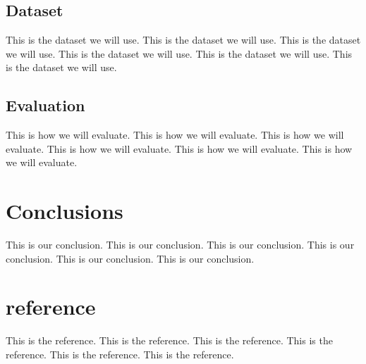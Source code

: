 \documentclass[sigconf]{acmart}
\begin{document}
\subsection{Dataset}
This is the dataset we will use.
This is the dataset we will use.
This is the dataset we will use.
This is the dataset we will use.
This is the dataset we will use.
This is the dataset we will use.

\subsection{Evaluation}
This is how we will evaluate.
This is how we will evaluate.
This is how we will evaluate.
This is how we will evaluate.
This is how we will evaluate.
This is how we will evaluate.


\section{Conclusions}
This is our conclusion.
This is our conclusion.
This is our conclusion.
This is our conclusion.
This is our conclusion.
This is our conclusion.


\section{reference}
This is the reference.
This is the reference.
This is the reference.
This is the reference.
This is the reference.
This is the reference.
\end{document}
